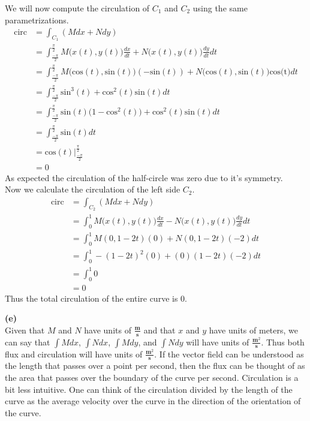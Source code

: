 \documentclass[12pt]{article}
\newcommand{\problem}[1]{\hspace{-4 ex} \large \textbf{#1}\\}
\begin{document}
	We will now compute the circulation of $C_1$ and $C_2$ using the same parametrizations.
	\begin{align*}
	\text{circ} & = \int_{C_1}(Mdx + Ndy) \\
		& = \int_{\tfrac{-\pi}{2}}^{\tfrac{\pi}{2}} M\big(x(t),y(t)\big)\tfrac{dx}{dt} + N\big(x(t),y(t)\big) \tfrac{dy}{dt} dt \\
		& = \int_{\tfrac{-\pi}{2}}^{\tfrac{\pi}{2}} M\big(\text{cos}(t),\text{sin}(t)\big)(-\text{sin}(t)) + N(\text{cos}(t),\text{sin}(t)\big)\text{cos(t)}  dt \\
		& = \int_{\tfrac{-\pi}{2}}^{\tfrac{\pi}{2}} \text{sin}^3(t) + \text{cos}^2(t)\text{sin}(t) dt \\
		& = \int_{\tfrac{-\pi}{2}}^{\tfrac{\pi}{2}} \text{sin}(t)\big(1-\text{cos}^2(t)\big) + \text{cos}^2(t)\text{sin}(t) dt \\
		& = \int_{\tfrac{-\pi}{2}}^{\tfrac{\pi}{2}} \text{sin}(t)dt \\
		& = \text{cos}(t)\Big\vert_{\tfrac{-\pi}{2}}^{\tfrac{\pi}{2}} \\
		& = 0
	\end{align*}
	As expected the circulation of the half-circle was zero due to it's symmetry. \\
	Now we calculate the circulation of the left side $C_2$.
	\begin{align*}
	\text{circ} & = \int_{C_2}(Mdx + Ndy) \\
		& = \int_{0}^{1} M\big(x(t),y(t)\big)\tfrac{dx}{dt} - N\big(x(t),y(t)\big) \tfrac{dy}{dt} dt \\
		& = \int_{0}^{1} M(0,1-2t)(0) + N(0,1-2t)(-2) dt \\
		& = \int_{0}^{1} -(1-2t)^2(0) + (0)(1-2t)(-2) dt \\
		& = \int_{0}^{1} 0 \\
		& = 0
	\end{align*}
	Thus the total circulation of the entire curve is $0$.
	
\problem{(e)}
	
	Given that $M$ and $N$ have units of $\tfrac{\textbf{m}}{\textbf{s}}$ and that $x$ and $y$ have units of meters, we can say that $\int M dx$, $\int N dx$, $\int M dy$, and $\int N dy$ will have units of $\tfrac{\textbf{m}^2}{\textbf{s}}$. Thus both flux and circulation will have units of $\tfrac{\textbf{m}^2}{\textbf{s}}$. If the vector field can be understood as the length that passes over a point per second, then the flux can be thought of as the area that passes over the boundary of the curve per second. Circulation is a bit less intuitive. One can think of the circulation divided by the length of the curve as the average velocity over the curve in the direction of the orientation of the curve.
	
	
\end{document}
